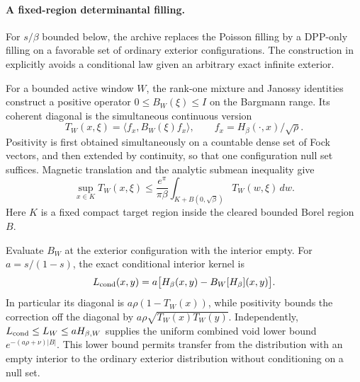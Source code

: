 \documentclass[11pt,a4paper]{article}
\theoremstyle{definition}
\theoremstyle{remark}
\numberwithin{equation}{section}
\begin{document}
\paragraph{A fixed-region determinantal filling.}
For $s/\beta$ bounded below, the archive replaces the Poisson filling by
a DPP-only filling on a favorable set of ordinary exterior
configurations. The construction in
 explicitly avoids a
conditional law given an arbitrary exact infinite exterior.

For a bounded active window $W$, the rank-one mixture and Janossy
identities construct a positive operator $0\le B_W(\xi)\le I$ on the
Bargmann range. Its coherent diagonal is the simultaneous continuous
version
\[
 T_W(x,\xi)=\langle f_x,B_W(\xi)f_x\rangle,
 \qquad f_x=H_\beta(\cdot,x)/\sqrt\rho.
\]
Positivity is first obtained simultaneously on a countable dense set
of Fock vectors, and then extended by continuity, so that one
configuration null set suffices. Magnetic translation and the
analytic submean inequality give
\begin{equation}
 \sup_{x\in K}T_W(x,\xi)
 \le\frac{e^\pi}{\pi\beta}
       \int_{K+B(0,\sqrt\beta)}T_W(w,\xi)\,dw.
 \label{sb:submean}
\end{equation}
Here $K$ is a fixed compact target region inside the cleared bounded
Borel region $B$.

Evaluate $B_W$ at the exterior configuration with the interior empty.
For $a=s/(1-s)$, the exact conditional interior kernel is
\begin{equation}
 L_{\rm cond}(x,y)=a\bigl[H_\beta(x,y)-B_W[H_\beta](x,y)\bigr].
 \label{sb:conditional-L}
\end{equation}
In particular its diagonal is $a\rho(1-T_W(x))$, while positivity
bounds the correction off the diagonal by
$a\rho\sqrt{T_W(x)T_W(y)}$. Independently,
$L_{\rm cond}\le L_W\le aH_{\beta,W}$ supplies the uniform combined
void lower bound $e^{-(a\rho+\nu)|B|}$. This lower bound permits transfer
from the distribution with an empty interior to the ordinary exterior
distribution without conditioning on a null set.
\end{document}
